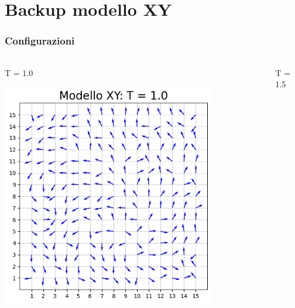 \section{Backup modello XY}

\begin{frame}
    \frametitle{Configurazioni}
    \framesubtitle{}

    \begin{columns}
        \begin{column}{0.5\textwidth}
            \begin{block}{T = 1.0}

            \centering
            \includegraphics[width=0.8\textwidth]{Immagini/backupXY/conf_T1.0.png}

            \end{block}
        \end{column}
    
        \begin{column}{0.5\textwidth}
            \begin{block}{T = 1.5}


\end{block}
\end{column}
\end{columns}
\end{frame}
